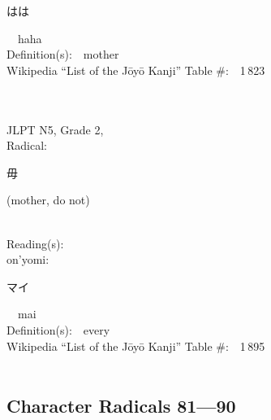 \begin{multicols}{2}
{\hspace*{2em}}{\begin{CJK}{UTF8}{min} はは \end{CJK}}\ \ haha\ \ \\
Definition(s):\ \ mother \\
Wikipedia ``List of the J\=oy\=o Kanji'' Table \#:\ \ 1\,823 \\
\ \ \\
{\fontsize{34pt}{40pt}  }\ \ \\  %
{JLPT N5, Grade 2, \\Radical:\ \ {\begin{CJK}{UTF8}{min} 毋 \end{CJK}} (mother, do not) } \\
Reading(s):\ \ \\
{\hspace*{1em}}on'yomi:\ \ \\
{\hspace*{2em}}{\begin{CJK}{UTF8}{min} マイ \end{CJK}}\ \ mai\ \ \\
Definition(s):\ \ every \\
Wikipedia ``List of the J\=oy\=o Kanji'' Table \#:\ \ 1\,895 \\
\ \ \\
\end{multicols}



\newpage



\subsection*{Character Radicals 81---90 }
  \label{P3-S10}

